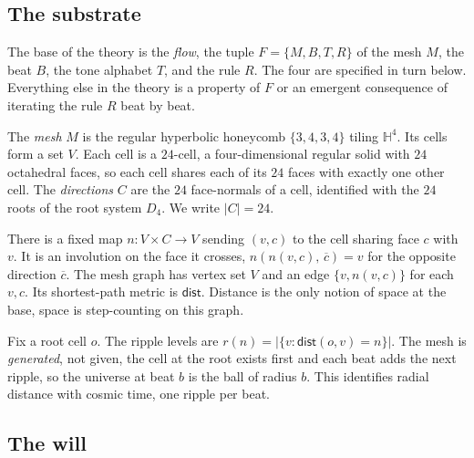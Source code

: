 \subsection{The substrate}

\begin{definition}
The base of the theory is the \emph{flow}, the tuple $F = \{M, B, T, R\}$ of the mesh $M$, the beat $B$, the tone
alphabet $T$, and the rule $R$. The four are specified in turn below. Everything else in the theory is a property
of $F$ or an emergent consequence of iterating the rule $R$ beat by beat.
\end{definition}

\begin{definition}
The \emph{mesh} $M$ is the regular hyperbolic honeycomb $\{3,4,3,4\}$ tiling $\mathbb{H}^4$. Its cells form a set
$V$. Each cell is a $24$-cell, a four-dimensional regular solid with $24$ octahedral faces, so each cell shares
each of its $24$ faces with exactly one other cell. The \emph{directions} $C$ are the $24$ face-normals of a cell,
identified with the $24$ roots of the root system $D_4$. We write $|C| = 24$.
\end{definition}

\begin{definition}
There is a fixed map $n : V \times C \to V$ sending $(v, c)$ to the cell sharing face $c$ with $v$. It is an
involution on the face it crosses, $n(n(v, c), \, \overline{c}) = v$ for the opposite direction $\overline{c}$.
The mesh graph has vertex set $V$ and an edge $\{v, n(v, c)\}$ for each $v, c$. Its shortest-path metric is
$\mathsf{dist}$. Distance is the only notion of space at the base, space is step-counting on this graph.
\end{definition}

\begin{definition}[Growth]
Fix a root cell $o$. The ripple levels are $r(n) = |\{v : \mathsf{dist}(o, v) = n\}|$. The mesh is
\emph{generated}, not given, the cell at the root exists first and each beat adds the next ripple, so the universe
at beat $b$ is the ball of radius $b$. This identifies radial distance with cosmic time, one ripple per beat.
\end{definition}

\subsection{The will}

